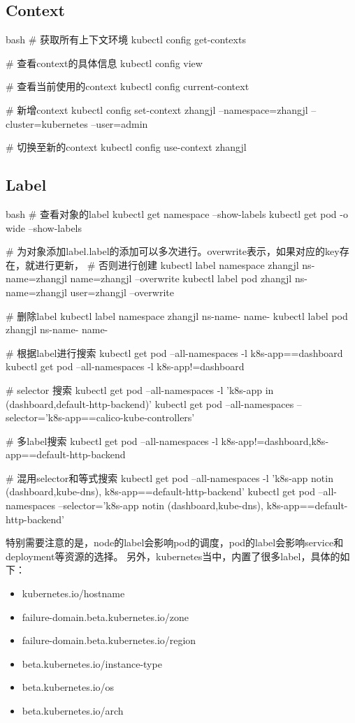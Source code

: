 \subsection{Context}
\begin{code-block}{bash}
# 获取所有上下文环境
kubectl config get-contexts

# 查看context的具体信息
kubectl config view

# 查看当前使用的context
kubectl config current-context

# 新增context
kubectl config set-context zhangjl --namespace=zhangjl --cluster=kubernetes --user=admin

# 切换至新的context
kubectl config use-context zhangjl

\end{code-block}

\subsection{Label}
\begin{code-block}{bash}
# 查看对象的label
kubectl get namespace --show-labels
kubectl get pod -o wide --show-labels

# 为对象添加label.label的添加可以多次进行。overwrite表示，如果对应的key存在，就进行更新，
# 否则进行创建
kubectl label namespace zhangjl ns-name=zhangjl name=zhangjl --overwrite
kubectl label pod zhangjl ns-name=zhangjl user=zhangjl --overwrite

# 删除label
kubectl label namespace zhangjl ns-name- name-
kubectl label pod zhangjl ns-name- name-

# 根据label进行搜索
kubectl get pod --all-namespaces  -l k8s-app==dashboard
kubectl get pod --all-namespaces  -l k8s-app!=dashboard

# selector 搜索
kubectl get pod --all-namespaces  -l 'k8s-app in (dashboard,default-http-backend)'
kubectl get pod --all-namespaces --selector='k8s-app==calico-kube-controllers'

# 多label搜索
kubectl get pod --all-namespaces  -l k8s-app!=dashboard,k8s-app==default-http-backend

# 混用selector和等式搜索
kubectl get pod --all-namespaces  -l 'k8s-app notin (dashboard,kube-dns), k8s-app==default-http-backend'
kubectl get pod --all-namespaces  --selector='k8s-app notin (dashboard,kube-dns), k8s-app==default-http-backend'
\end{code-block}
特别需要注意的是，node的label会影响pod的调度，pod的label会影响service和deployment等资源的选择。
另外，kubernetes当中，内置了很多label，具体的如下：
\begin{itemize}
    \item kubernetes.io/hostname
    \item failure-domain.beta.kubernetes.io/zone
    \item failure-domain.beta.kubernetes.io/region
    \item beta.kubernetes.io/instance-type
    \item beta.kubernetes.io/os
    \item beta.kubernetes.io/arch
\end{itemize}

